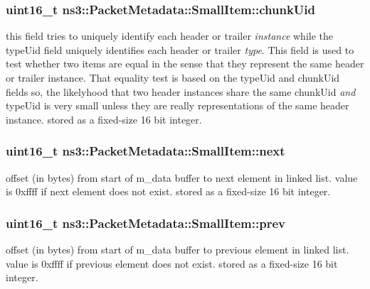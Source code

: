 \subsubsection[{\texorpdfstring{chunk\+Uid}{chunkUid}}]{\setlength{\rightskip}{0pt plus 5cm}uint16\+\_\+t ns3\+::\+Packet\+Metadata\+::\+Small\+Item\+::chunk\+Uid}\hypertarget{structns3_1_1PacketMetadata_1_1SmallItem_a427c33307aeeae9080e7bd71b09d06c0}{}\label{structns3_1_1PacketMetadata_1_1SmallItem_a427c33307aeeae9080e7bd71b09d06c0}
this field tries to uniquely identify each header or trailer {\itshape instance} while the type\+Uid field uniquely identifies each header or trailer {\itshape type}. This field is used to test whether two items are equal in the sense that they represent the same header or trailer instance. That equality test is based on the type\+Uid and chunk\+Uid fields so, the likelyhood that two header instances share the same chunk\+Uid {\itshape and} type\+Uid is very small unless they are really representations of the same header instance. stored as a fixed-\/size 16 bit integer. 
\subsubsection[{\texorpdfstring{next}{next}}]{\setlength{\rightskip}{0pt plus 5cm}uint16\+\_\+t ns3\+::\+Packet\+Metadata\+::\+Small\+Item\+::next}\hypertarget{structns3_1_1PacketMetadata_1_1SmallItem_a2f5c9e2e9e29b6079de9fdad01537f13}{}\label{structns3_1_1PacketMetadata_1_1SmallItem_a2f5c9e2e9e29b6079de9fdad01537f13}
offset (in bytes) from start of m\+\_\+data buffer to next element in linked list. value is 0xffff if next element does not exist. stored as a fixed-\/size 16 bit integer. 
\subsubsection[{\texorpdfstring{prev}{prev}}]{\setlength{\rightskip}{0pt plus 5cm}uint16\+\_\+t ns3\+::\+Packet\+Metadata\+::\+Small\+Item\+::prev}\hypertarget{structns3_1_1PacketMetadata_1_1SmallItem_ade45c814d12b7f18c0b412d037707271}{}\label{structns3_1_1PacketMetadata_1_1SmallItem_ade45c814d12b7f18c0b412d037707271}
offset (in bytes) from start of m\+\_\+data buffer to previous element in linked list. value is 0xffff if previous element does not exist. stored as a fixed-\/size 16 bit integer. 
